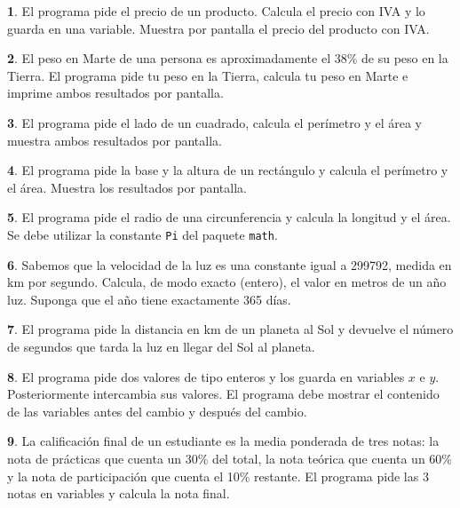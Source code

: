 \documentclass[a4paper, 12pt]{article}
\theoremstyle{definition}
\newtheorem{ejer}{}[section]
\begin{document}
\begin{ejer}
El programa pide el precio de un producto. Calcula el precio con IVA y lo guarda en una variable.  Muestra por pantalla el precio del producto con  IVA.
\end{ejer}

\begin{ejer}
El peso en Marte de una persona es aproximadamente el  38\% de su peso en la Tierra. El programa pide tu peso  en la Tierra, calcula tu peso en Marte e imprime ambos resultados por pantalla.
\end{ejer}

\begin{ejer}
El programa pide el lado de un cuadrado, calcula el perímetro y el área y muestra ambos resultados por pantalla.
\end{ejer}

\begin{ejer}
El programa pide la base y la altura de un rectángulo y calcula el perímetro y el área. Muestra los resultados por pantalla.
\end{ejer}

\begin{ejer}    
El programa pide el radio de una circunferencia y calcula la longitud y el área. Se debe utilizar la constante \verb|Pi| del paquete \verb|math|.
\end{ejer}

\begin{ejer}
Sabemos que la velocidad de la luz es una constante igual a 299792, medida en km por segundo. Calcula, de modo exacto (entero), el valor en metros de un año luz. Suponga que el año tiene exactamente 365 días.
\end{ejer}

\begin{ejer}
El programa pide la distancia en km de un planeta al Sol y devuelve el número de segundos que tarda la luz en llegar del Sol al planeta.
\end{ejer}

\begin{ejer}
El programa pide dos valores de tipo enteros y los guarda en variables $x$ e $y$.  Posteriormente intercambia sus valores. El programa debe mostrar el contenido de las variables antes del cambio y después del cambio.
\end{ejer}

\begin{ejer}
La calificación final de un estudiante es la media ponderada de tres notas: la nota de prácticas que cuenta un 30\% del total, la nota teórica que cuenta un 60\% y la nota de participación que cuenta el 10\% restante. El programa pide las 3 notas en variables  y calcula la nota final.
\end{ejer}
\end{document}
